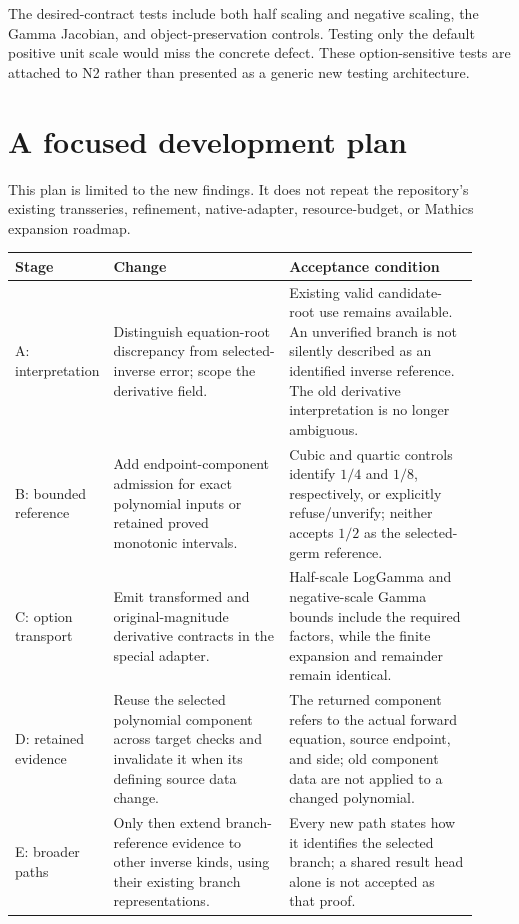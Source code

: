 \documentclass[11pt,letterpaper]{article}
\begin{document}
The desired-contract tests include both half scaling and negative scaling, the Gamma Jacobian, and object-preservation controls. Testing only the default positive unit scale would miss the concrete defect. These option-sensitive tests are attached to N2 rather than presented as a generic new testing architecture.

\section{A focused development plan}
\label{sec:roadmap}

This plan is limited to the new findings. It does not repeat the repository's existing transseries, refinement, native-adapter, resource-budget, or Mathics expansion roadmap.

\begin{longtable}{@{}P{0.13\linewidth}P{0.38\linewidth}P{0.41\linewidth}@{}}
\toprule
Stage & Change & Acceptance condition\\\midrule\endhead
A: interpretation & Distinguish equation-root discrepancy from selected-inverse error; scope the derivative field. & Existing valid candidate-root use remains available. An unverified branch is not silently described as an identified inverse reference. The old derivative interpretation is no longer ambiguous.\\[6pt]
B: bounded reference & Add endpoint-component admission for exact polynomial inputs or retained proved monotonic intervals. & Cubic and quartic controls identify $1/4$ and $1/8$, respectively, or explicitly refuse/unverify; neither accepts $1/2$ as the selected-germ reference.\\[6pt]
C: option transport & Emit transformed and original-magnitude derivative contracts in the special adapter. & Half-scale LogGamma and negative-scale Gamma bounds include the required factors, while the finite expansion and remainder remain identical.\\[6pt]
D: retained evidence & Reuse the selected polynomial component across target checks and invalidate it when its defining source data change. & The returned component refers to the actual forward equation, source endpoint, and side; old component data are not applied to a changed polynomial.\\[6pt]
E: broader paths & Only then extend branch-reference evidence to other inverse kinds, using their existing branch representations. & Every new path states how it identifies the selected branch; a shared result head alone is not accepted as that proof.\\
\bottomrule
\end{longtable}
\end{document}
